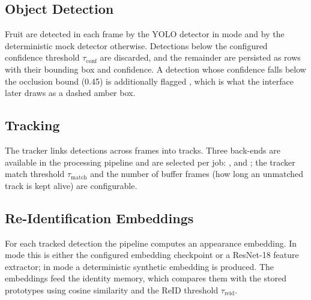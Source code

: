 \subsection{Object Detection}

Fruit are detected in each frame by the YOLO detector in  mode and by the deterministic mock detector otherwise. Detections below the configured confidence threshold $\tau_{\mathrm{conf}}$ are discarded, and the remainder are persisted as  rows with their bounding box and confidence. A detection whose confidence falls below the occlusion bound (0.45) is additionally flagged , which is what the interface later draws as a dashed amber box.

\subsection{Tracking}

The tracker links detections across frames into tracks. Three back-ends are available in the processing pipeline and are selected per job: ,  and ; the tracker match threshold $\tau_{\mathrm{match}}$ and the number of buffer frames (how long an unmatched track is kept alive) are configurable. 


\subsection{Re-Identification Embeddings}

For each tracked detection the pipeline computes an appearance embedding. In  mode this is either the configured embedding checkpoint or a ResNet-18 feature extractor; in  mode a deterministic synthetic embedding is produced. The embeddings feed the identity memory, which compares them with the stored prototypes using cosine similarity and the ReID threshold $\tau_{\mathrm{reid}}$.

